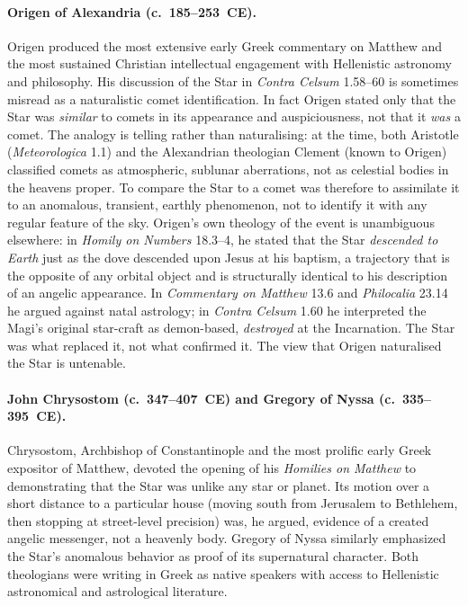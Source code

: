 \documentclass[11pt,a4paper]{article}
\begin{document}
\paragraph{Origen of Alexandria (c.~185--253~CE).}
Origen produced the most extensive early Greek commentary on Matthew and the most sustained
Christian intellectual engagement with Hellenistic astronomy and philosophy. His discussion
of the Star in \textit{Contra Celsum} 1.58--60 is sometimes misread as a naturalistic comet
identification. In fact Origen stated only that the Star was \emph{similar} to comets in its
appearance and auspiciousness, not that it \emph{was} a comet. The analogy is telling rather
than naturalising: at the time, both Aristotle (\textit{Meteorologica} 1.1) and the Alexandrian
theologian Clement (known to Origen) classified comets as atmospheric, sublunar aberrations,
not as celestial bodies in the heavens proper. To compare the Star to a comet was therefore
to assimilate it to an anomalous, transient, earthly phenomenon, not to identify it with any
regular feature of the sky. Origen's own theology of the event is unambiguous elsewhere:
in \textit{Homily on Numbers} 18.3--4, he stated that the Star \emph{descended to Earth}
just as the dove descended upon Jesus at his baptism, a trajectory that is the opposite of
any orbital object and is structurally identical to his description of an angelic appearance.
In \textit{Commentary on Matthew} 13.6 and \textit{Philocalia} 23.14 he argued against natal
astrology; in \textit{Contra Celsum} 1.60 he interpreted the Magi's original star-craft as
demon-based, \emph{destroyed} at the Incarnation. The Star was what replaced it, not what
confirmed it. The view that Origen naturalised the Star is untenable.

\paragraph{John Chrysostom (c.~347--407~CE) and Gregory of Nyssa (c.~335--395~CE).}
Chrysostom, Archbishop of Constantinople and the most prolific early Greek expositor of Matthew,
devoted the opening of his \textit{Homilies on Matthew} to demonstrating that the Star was unlike
any star or planet. Its motion over a short distance to a particular house (moving south from
Jerusalem to Bethlehem, then stopping at street-level precision) was, he argued, evidence of
a created angelic messenger, not a heavenly body. Gregory of Nyssa similarly emphasized the Star's
anomalous behavior as proof of its supernatural character. Both theologians were writing in
Greek as native speakers with access to Hellenistic astronomical and astrological literature.
\end{document}
